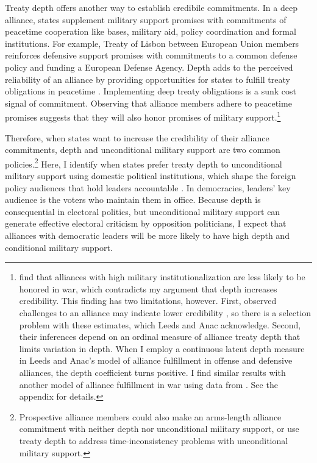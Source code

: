 \documentclass[12pt]{article}
\begin{document}
Treaty depth offers another way to establish credibile commitments.
In a deep alliance, states supplement military support promises with commitments of peacetime cooperation like bases, military aid, policy coordination and formal institutions. 
For example, Treaty of Lisbon between European Union members reinforces defensive support promises with commitments to a common defense policy and funding a European Defense Agency. 
Depth adds to the perceived reliability of an alliance by providing opportunities for states to fulfill treaty obligations in peacetime \citep{Morrow1994}. 
Implementing deep treaty obligations is a sunk cost signal of commitment.
Observing that alliance members adhere to peacetime promises suggests that they will also honor promises of military support.\footnote{\citet{LeedsAnac2005} find that alliances with high military institutionalization are less likely to be honored in war, which contradicts my argument that depth increases credibility. 
This finding has two limitations, however. 
First, observed challenges to an alliance may indicate lower credibility \citep{Smith1995}, so there is a selection problem with these estimates, which Leeds and Anac acknowledge. 
Second, their inferences depend on an ordinal measure of alliance treaty depth that limits variation in depth. 
When I employ a continuous latent depth measure in Leeds and Anac's model of alliance fulfillment in offense and defensive alliances, the depth coefficient turns positive. 
I find similar results with another model of alliance fulfillment in war using data from \citet{BerkemeierFuhrmann2018}.
See the appendix for details.} 


Therefore, when states want to increase the credibility of their alliance commitments, depth and unconditional military support are two common policies.\footnote{Prospective alliance members could also make an arms-length alliance commitment with neither depth nor unconditional military support, or use treaty depth to address time-inconsistency problems with unconditional military support.} 
Here, I identify when states prefer treaty depth to unconditional military support using domestic political institutions, which shape the foreign policy audiences that hold leaders accountable \citep{HydeSaunders2020}. 
In democracies, leaders' key audience is the voters who maintain them in office.  
Because depth is consequential in electoral politics, but unconditional military support can generate effective electoral criticism by opposition politicians, I expect that alliances with democratic leaders will be more likely to have high depth and conditional military support. 
\end{document}
